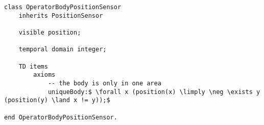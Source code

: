 \begin{lstlisting}[fontadjust, mathescape, frame=single] 
class OperatorBodyPositionSensor
    inherits PositionSensor

    visible position;

    temporal domain integer;

    TD items
        axioms
            -- the body is only in one area
            uniqueBody:$ \forall x (position(x) \limply \neg \exists y (position(y) \land x != y));$

end OperatorBodyPositionSensor.\end{lstlisting}